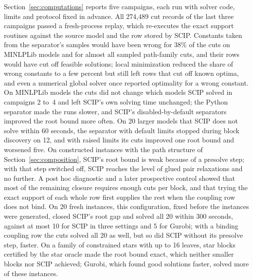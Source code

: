 Section~\ref{sec:computations} reports five campaigns, each run with solver
code, limits and protocol fixed in advance. All 274{,}489 cut records of the
last three campaigns passed a fresh-process replay, which re-executes the exact
support routines against the source model and the row stored by SCIP.
Constants taken from the separator's samples would have been wrong for 38\% of
the cuts on MINLPLib models and for almost all sampled path-family cuts, and
their rows would have cut off feasible solutions; local minimization reduced
the share of wrong constants to a few percent but still left rows that cut off
known optima, and even a numerical global solver once reported optimality for a
wrong constant. On MINLPLib models the cuts did not change which models SCIP
solved in campaigns 2 to~4 and left SCIP's own solving time unchanged; the
Python separator made the runs slower, and SCIP's disabled-by-default
separators improved the root bound more often. On 20 larger models that SCIP
does not solve within 60 seconds, the separator with default limits stopped
during block discovery on 12, and with raised limits its cuts improved one root
bound and worsened five. On constructed instances with the path structure of
Section~\ref{sec:composition}, SCIP's root bound is weak because of a presolve
step; with that step switched off, SCIP reaches the level of glued pair
relaxations and no further. A post hoc diagnostic and a later prospective
control showed that most of the remaining closure requires enough cuts per
block, and that trying the exact support of each whole row first supplies the
rest when the coupling row does not bind. On 20 fresh instances, this
configuration, fixed before the instances were generated, closed SCIP's root
gap and solved all 20 within 300 seconds, against at most 10 for SCIP in three
settings and 5 for Gurobi; with a binding coupling row the cuts solved all 20 as
well, but so did SCIP without its presolve step, faster. On a family of
constrained stars with up to 16 leaves, star blocks certified by the star
oracle made the root bound exact, which neither smaller blocks nor SCIP
achieved; Gurobi, which found good solutions faster, solved more of these
instances.
